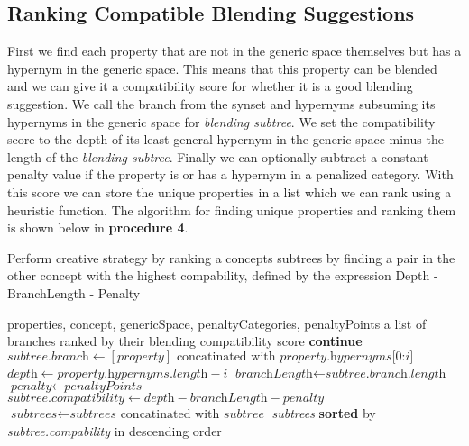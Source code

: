\subsection{Ranking Compatible Blending Suggestions}
First we find each property that are not in the generic space themselves but has a hypernym in the generic space. This means that this property can be blended and we can give it a compatibility score for whether it is a good blending suggestion. We call the branch from the synset and hypernyms subsuming its hypernyms in the generic space for \emph{blending subtree}. We set the compatibility score to the depth of its least general hypernym in the generic space minus the length of the \emph{blending subtree}. Finally we can optionally subtract a constant penalty value if the property is or has a hypernym in a penalized category. With this score we can store the unique properties in a list which we can rank using a heuristic function. The algorithm for finding unique properties and ranking them is shown below in \textbf{procedure 4}.

\begin{algorithm}
	\caption{Perform creative strategy by ranking a concepts subtrees by finding a pair in the other concept with the highest compability, defined by the expression Depth - BranchLength - Penalty}\label{euclid}
	\begin{algorithmic}[1]
		\Require properties,
		concept,
		genericSpace,
		penaltyCategories,
		penaltyPoints
		\Ensure a list of branches ranked by their blending compatibility score
		\State \textbf{continue}
		\EndIf
		\EndIf
		\State ${\textit{subtree.branch} \gets {[\textit{property}] \text{ concatinated with } \textit{property.hypernyms[0:i]}}}$
		\State ${\textit{depth} \gets {\textit{property.hypernyms.length} - i}}$
		\State ${\textit{branchLength} \gets {\textit{subtree.branch.length}}}$
		\State ${\textit{penalty} \gets \textit{penaltyPoints}}$
		\EndIf
		\State ${\textit{subtree.compatibility} \gets {\textit{depth} - \textit{branchLength} - \textit{penalty}}}$
		\State ${\textit{subtrees} \gets {\textit{subtrees} \text{ concatinated with } \textit{subtree}}}$
		\EndFor
		\EndFor
		\State \Return \textit{subtrees} \textbf{sorted} by \textit{subtree.compability} in descending order
	\EndProcedure
\end{algorithmic}
\end{algorithm}

